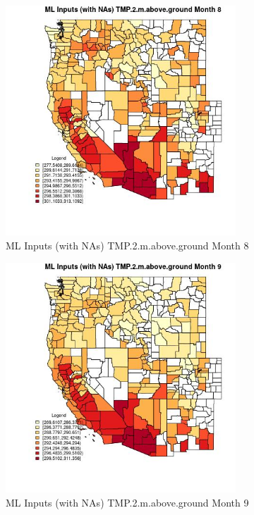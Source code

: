\begin{figure} 
\centering  
\includegraphics[width=0.77\textwidth]{Code_Outputs/Report_ML_input_PM25_Step4_part_f_de_duplicated_aves_prioritize_24hr_obswNAs_CountyTMP2mabovegroundmedianMonth8.jpg} 
\caption{\label{fig:Report_ML_input_PM25_Step4_part_f_de_duplicated_aves_prioritize_24hr_obswNAsCountyTMP2mabovegroundmedianMonth8}ML Inputs (with NAs) TMP.2.m.above.ground Month 8} 
\end{figure} 
 

\begin{figure} 
\centering  
\includegraphics[width=0.77\textwidth]{Code_Outputs/Report_ML_input_PM25_Step4_part_f_de_duplicated_aves_prioritize_24hr_obswNAs_CountyTMP2mabovegroundmedianMonth9.jpg} 
\caption{\label{fig:Report_ML_input_PM25_Step4_part_f_de_duplicated_aves_prioritize_24hr_obswNAsCountyTMP2mabovegroundmedianMonth9}ML Inputs (with NAs) TMP.2.m.above.ground Month 9} 
\end{figure} 
 

